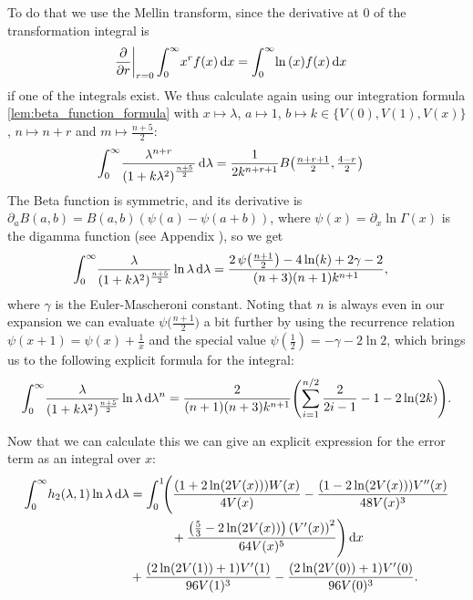 To do that we use the Mellin transform, since the derivative at $0$ of the
transformation integral is
\begin{align*}
    \left.\frac\partial{\partial r}\right|_{r=0}\Integ[\infty]{0}{x}{x^r f(x)}
    &= \Integ[\infty]{0}{x}{\ln{(x)} f(x)}
\end{align*}
if one of the integrals exist. We thus calculate again using our integration
formula \ref{lem:beta_function_formula} with $x\mapsto \lambda$, $a \mapsto 1$,
$b \mapsto k \in\{V(0), V(1), V(x)\}$, $n \mapsto n + r$ and $m \mapsto
\tfrac{n+5}{2}$:
\begin{align*}
    \Integ[\infty]{0}{\lambda}{\frac{\lambda^{n + r}}{\left(1 +
    k\lambda^2\right)^{\frac{n+5}{2}}}} &=
      \frac{1}{2k^{n+r+1}} B\bigl(\tfrac{n+r+1}{2}, \tfrac{4-r}{2}\bigr)
\end{align*}
The Beta function is symmetric, and its derivative is $\partial_a B(a,b) =
B(a,b) (\psi(a) - \psi(a+b))$, where $\psi(x) = \partial_x \ln\Gamma(x)$ is the
digamma function (see Appendix %
), so we get
\begin{align*}
  \Integ[\infty]{0}{\lambda}{
    \frac{\lambda}{(1 + k\lambda^2)^{\frac{n+5}{2}}}\ln\lambda
  } &=
      \frac{
        2\,\psi\bigl(\frac{n+1}{2}\bigr) - 4\ln(k) + 2\gamma - 2
      }{
           (n+3)(n+1)k^{n+1}
      },
\end{align*}
where $\gamma$ is the Euler-Mascheroni constant. Noting that $n$ is always even
in our expansion we can evaluate $\psi\bigl(\tfrac{n+1}{2}\bigr)$ a bit further
by using the recurrence relation
$\psi(x + 1) = \psi(x) + \tfrac{1}{x}$ and the special value $\psi(\tfrac{1}{2})
= -\gamma - 2\ln 2$, which brings us to the following explicit formula for the
integral:
\begin{align}
  \Integ[\infty]{0}{\lambda^n}{
    \frac{\lambda}{(1 + k \lambda^2)^{\frac{n+5}{2}}}
    \ln\lambda
  } = \frac{2}{(n+1)(n+3)k^{n+1}}
  \Biggl( \sum_{i=1}^{n/2}\frac{2}{2i - 1} -1 - 2\ln(2k) \Biggr).
\end{align}

Now that we can calculate this we can give an explicit expression for the error
term as an integral over $x$:
\begin{align}
  \Integ[\infty]{0}{\lambda}{
    h_2(\lambda, 1) \ln\lambda
  }
  &=
  \label{eqn:interior_result}
  \Int{x}{\Biggl(\frac{(1 + 2 \ln(2 V(x))) W(x)}{4 V(x)}
- \frac{ (1 - 2 \ln(2 V(x)))V''(x)}{48 V(x)^{3}} \\
&\hphantom{=\int_0^1\Biggl(}\mathbin+ \frac{\left(\frac{5}{3} - 2\ln(2
V(x))\right)\left(V'(x)\right)^{2}}{64 V(x)^{5}}\Biggr) } \nonumber \\
&\mathbin+ \frac{(2 \ln(2 V(1)) + 1)V'(1)}{96 V(1)^3}
- \frac{(2 \ln(2 V(0)) + 1)V'(0)}{96 V(0)^3}.
\label{eqn:exterior_result}
\end{align}
